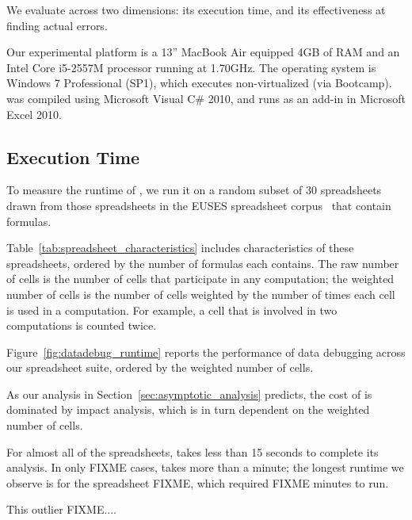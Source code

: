 We evaluate \checkcell{} across two dimensions: its execution time,
and its effectiveness at finding actual errors.

Our experimental platform is a 13'' MacBook Air equipped 4GB of RAM
and an Intel Core i5-2557M processor running at 1.70GHz. The operating
system is Windows 7 Professional (SP1), which executes non-virtualized
(via Bootcamp). \checkcell{} was compiled using Microsoft Visual C\#
2010, and runs as an add-in in Microsoft Excel 2010.

\subsection{Execution Time}
\label{sec:execution_time}

To measure the runtime of \checkcell{}, we run it on a random subset
of 30 spreadsheets drawn from those spreadsheets in the EUSES
spreadsheet corpus~\cite{Fisher:2005:ESC:1082983.1083242} that contain
formulas.

Table~\ref{tab:spreadsheet_characteristics} includes
characteristics of these spreadsheets, ordered by the number of
formulas each contains. The raw number of cells is the number of cells
that participate in any computation; the weighted number of cells is
the number of cells weighted by the number of times each cell is used
in a computation. For example, a cell that is involved in two
computations is counted twice.

Figure~\ref{fig:datadebug_runtime} reports the performance of data
debugging across our spreadsheet suite, ordered by the weighted number
of cells.

As our analysis in Section~\ref{sec:asymptotic_analysis} predicts, the
cost of \checkcell{} is dominated by impact analysis, which is in turn
dependent on the weighted number of cells.

For almost all of the spreadsheets, \checkcell{} takes less than 15
seconds to complete its analysis. In only FIXME cases, \checkcell{}
takes more than a minute; the longest runtime we observe is for the
spreadsheet FIXME, which required FIXME minutes to run.

This outlier FIXME....

